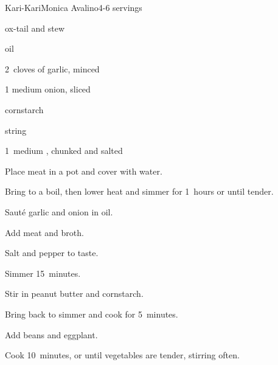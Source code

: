 \begin{recipe}{Kari-Kari}{Monica Avalino}{4-6 servings}

\begin{ingredients}
\item \lbs{2 \half} ox-tail and stew 
\item {} oil
\item 2~cloves of garlic, minced 
\item 1 medium onion, sliced
\item {} 
\item {} cornstarch
\item \lbs{\half} string 
\item 1~medium , chunked and salted
\end{ingredients}

\begin{directions}
\item Place meat in a pot and cover with water.
\item Bring to a boil, then lower heat and simmer for 1\half~hours or until tender.
\item Saut\'e garlic and onion in oil.
\item Add meat and broth.
\item Salt and pepper to taste.
\item Simmer 15~minutes.
\item Stir in peanut butter and cornstarch.
\item Bring back to simmer and cook for 5~minutes.
\item Add beans and eggplant.
\item Cook 10~minutes, or until vegetables are tender, stirring often.
\end{directions}

\end{recipe}

